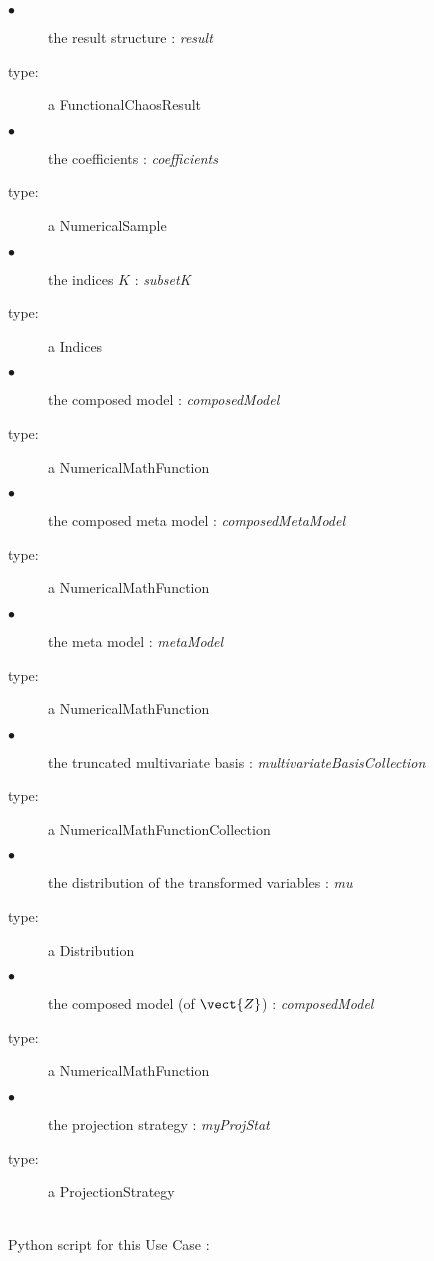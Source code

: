              {
               \begin{description}
               \item[$\bullet$] the  result structure : {\itshape result}
               \item[type:] a FunctionalChaosResult
               \item[$\bullet$] the coefficients : {\itshape coefficients}
               \item[type:] a NumericalSample
               \item[$\bullet$] the indices $K$ : {\itshape subsetK}
               \item[type:] a Indices
               \item[$\bullet$] the composed model : {\itshape composedModel}
               \item[type:] a NumericalMathFunction
               \item[$\bullet$] the composed meta model : {\itshape composedMetaModel}
               \item[type:] a NumericalMathFunction
               \item[$\bullet$] the meta model : {\itshape metaModel}
               \item[type:] a NumericalMathFunction
               \item[$\bullet$]  the truncated multivariate basis : {\itshape multivariateBasisCollection}
               \item[type:] a NumericalMathFunctionCollection
               \item[$\bullet$] the distribution of the transformed variables : {\itshape mu}
               \item[type:] a Distribution
               \item[$\bullet$]   the composed model (of $\vect{Z}$) : {\itshape composedModel}
               \item[type:] a NumericalMathFunction
               \item[$\bullet$]   the projection strategy : {\itshape myProjStat}
               \item[type:] a ProjectionStrategy
               \end{description}
             }

             \textspace\\
             Python  script for this Use Case :



